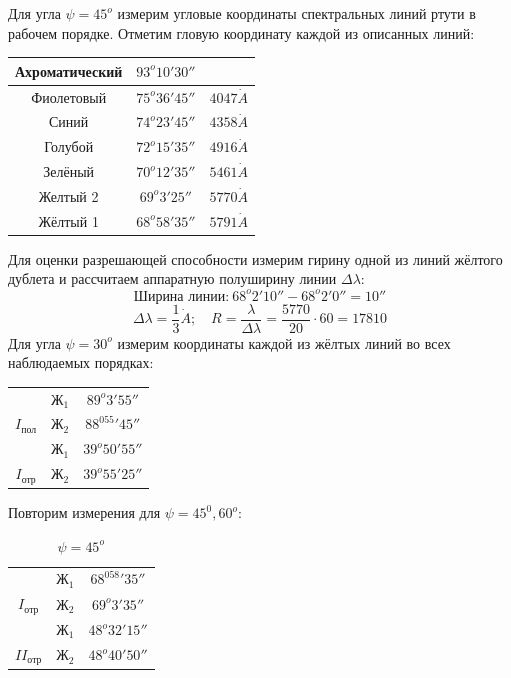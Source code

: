\documentclass[a4paper,12pt]{article}
\begin{document}
Для угла $\psi = 45^o$ измерим угловые координаты спектральных линий ртути в рабочем порядке. Отметим гловую координату каждой из описанных линий:
\begin{table}[h]
	\centering
	\begin{tabular}{|c|c|c|}  \hline
	Ахроматический & $93^o 10' 30''$ & {} \\\hline
	Фиолетовый & $75^o 36' 45''$ & $4047 \dot A$ \\\hline
	Синий & $74^o 23' 45''$ & $4358 \dot A$ \\\hline
	Голубой & $72^o15'35''$ & $4916 \dot A$ \\\hline
 	Зелёный & $70^o12'35''$ & $5461 \dot A$ \\\hline
	Желтый 2 & $69^o 3' 25''$ & $5770 \dot A$ \\\hline
	Жёлтый 1 & $68^o 58'35''$ & $5791 \dot A$ \\\hline
	\end{tabular}
	\end{table}
	Для оценки разрешающей способности измерим гирину одной из линий жёлтого дублета и рассчитаем аппаратную полуширину линии $\Delta \lambda$:
	\[
	\text{Ширина линии:}\ 68^o2'10'' - 68^o2'0'' = 10'' 
	\]
	\[
	\Delta \lambda = \frac{1}{3} \dot A; \quad R = \frac{\lambda}{\Delta \lambda} =\frac{5770}{20} \cdot 60 =  17810
	\]
	Для угла $\psi = 30^o$ измерим координаты каждой из жёлтых линий во всех наблюдаемых порядках:
\begin{table}[h]
\begin{center}
\begin{tabular}{|c|c|c|} \hline
& $Ж_1$ & $89^o3'55''$ \\
\cline{2-3}
$I_{пол}$
& $Ж_2$ & $88^055'45''$ \\\hline
& $Ж_1$ & $39^o50'55''$ \\
\cline{2-3}
$I_{отр}$
& $Ж_2$ & $39^o55'25''$ \\\hline
\end{tabular}
\end{center}
\end{table}
Повторим измерения для $\psi = 45^0, 60^o$:

\begin{table}[h]	
\begin{center}
\begin{tabular}{|c|c|c|} \hline
& $Ж_1$ & $68^058'35''$\\
\cline{2-3}
$I_{отр}$
& $Ж_2$ & $69^o3'35''$ \\\hline
& $Ж_1$ & $48^o32'15''$ \\
\cline{2-3}
$II_{отр}$
& $Ж_2$ & $48^o40'50''$ \\\hline
\end{tabular}
\caption{$\psi = 45^o$}
\end{center}
\end{table}
\end{document}

